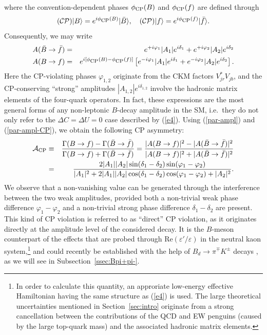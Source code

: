 \documentclass[12pt]{article}
\begin{document}
where the convention-dependent phases $\phi_{\mbox{{\scriptsize CP}}}(B)$ 
and $\phi_{\mbox{{\scriptsize CP}}}(f)$ are defined through
\begin{equation}\label{CP-phase-def}
({\cal CP})\vert B\rangle=
e^{i\phi_{\mbox{{\scriptsize CP}}}(B)}
\vert\bar B\rangle, \quad 
({\cal CP})\vert f\rangle=
e^{i\phi_{\mbox{{\scriptsize CP}}}(f)}
\vert\bar f\rangle.
\end{equation}
Consequently, we may write
\begin{eqnarray}
A(\bar B\to\bar f)&=&e^{+i\varphi_1}
|A_1|e^{i\delta_1}+e^{+i\varphi_2}|A_2|e^{i\delta_2}\label{par-ampl}\\
A(B\to f)&=&e^{i[\phi_{\mbox{{\scriptsize CP}}}(B)-\phi_{\mbox{{\scriptsize CP}}}(f)]}
\left[e^{-i\varphi_1}|A_1|e^{i\delta_1}+e^{-i\varphi_2}|A_2|e^{i\delta_2}
\right].\label{par-ampl-CP}
\end{eqnarray}
Here the CP-violating phases $\varphi_{1,2}$ originate from the CKM factors 
$V_{jr}^\ast V_{jb}$, and the CP-conserving ``strong'' amplitudes
$|A_{1,2}|e^{i\delta_{1,2}}$ involve the hadronic matrix elements of the 
four-quark operators. In fact, these expressions are the most general forms
of any non-leptonic $B$-decay amplitude in the SM, i.e.\ they do not only
refer to the $\Delta C=\Delta U=0$ case described by (\ref{e4}). 
Using (\ref{par-ampl}) and (\ref{par-ampl-CP}), we obtain
the following CP asymmetry:
\begin{eqnarray}
{\cal A}_{\rm CP}&\equiv&\frac{\Gamma(B\to f)-
\Gamma(\bar B\to\bar f)}{\Gamma(B\to f)+\Gamma(\bar B
\to \bar f)}=\frac{|A(B\to f)|^2-|A(\bar B\to \bar f)|^2}{|A(B\to f)|^2+
|A(\bar B\to \bar f)|^2}\nonumber\\
&=&\frac{2|A_1||A_2|\sin(\delta_1-\delta_2)
\sin(\varphi_1-\varphi_2)}{|A_1|^2+2|A_1||A_2|\cos(\delta_1-\delta_2)
\cos(\varphi_1-\varphi_2)+|A_2|^2}.\label{direct-CPV}
\end{eqnarray}
We observe that a non-vanishing value can be generated through the 
interference between the two weak amplitudes, provided both a non-trivial 
weak phase difference $\varphi_1-\varphi_2$ and a non-trivial strong phase 
difference $\delta_1-\delta_2$ are present. This kind of
CP violation is referred to as ``direct'' CP violation, as it originates 
directly at the amplitude level of the considered decay. It is the 
$B$-meson counterpart of the effects that are probed through 
$\mbox{Re}(\varepsilon'/\varepsilon)$ in the neutral kaon 
system,\footnote{In order to calculate this quantity, an approriate 
low-energy effective Hamiltonian having the same structure as (\ref{e4}) 
is used. The large theoretical uncertainties mentioned in Section~\ref{sec:intro} 
originate from a strong cancellation 
between the contributions of the QCD and EW penguins (caused by the
large top-quark mass) and the associated
hadronic matrix elements.} and could recently be established with the help of 
$B_d\to\pi^\mp K^\pm$ decays \cite{CP-B-dir}, as we will see in
Subsection~\ref{ssec:Bpi+pi-}.
\end{document}

